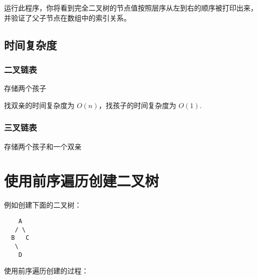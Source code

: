 运行此程序，你将看到完全二叉树的节点值按照层序从左到右的顺序被打印出来，并验证了父子节点在数组中的索引关系。

\subsection{时间复杂度}

\subsubsection{二叉链表}

存储两个孩子

找双亲的时间复杂度为 $O(n)$，找孩子的时间复杂度为 $O(1)$.

\subsubsection{三叉链表}

存储两个孩子和一个双亲

\section{使用前序遍历创建二叉树}

例如创建下面的二叉树：

\begin{lstlisting}
    A
   / \
  B   C
   \
    D
\end{lstlisting}
使用前序遍历创建的过程：

